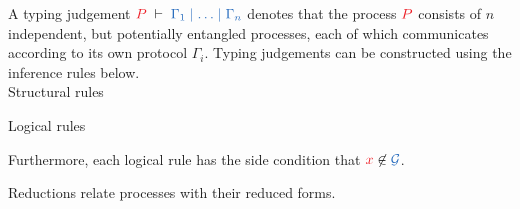 \documentclass[envcountsame,envcountsect,UKenglish]{llncs}
\begin{document}
\begin{definition}\label{def:cp-typing-judgement}
  A typing judgement $\seq[P]{\Gamma_1 \hsep \dots \hsep \Gamma_n}$ denotes that the process $\tm{P}$ consists of $n$ independent, but potentially entangled processes, each of which communicates according to its own protocol $\Gamma_i$. Typing judgements can be constructed using the inference rules below. 
  \\[0.5\baselineskip]
  {Structural rules}
  \begin{center}
    \hcpInfAx
    \hcpInfCut
  \end{center}
  \begin{center}
    \hcpInfMix
    \hcpInfHalt
  \end{center}
  {Logical rules}
  \begin{center}
    \hcpInfBoundTens
    \hcpInfParr
  \end{center}
  \begin{center}
    \hcpInfOne
    \hcpInfBot
  \end{center}
  \begin{center}
  \end{center}
  \begin{center}
    \hcpInfWith
  \end{center}
  \begin{center}
    \hcpInfNil
    \hcpInfTop
  \end{center}
  Furthermore, each logical rule has the side condition that $\tm{x} \not\in \ty{\mathcal{G}}$.
\end{definition}
Reductions relate processes with their reduced forms.
\end{document}
